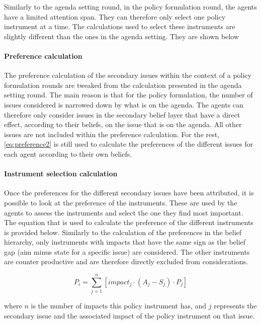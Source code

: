 Similarly to the agenda setting round, in the policy formulation round, the agents have a limited attention span. They can therefore only select one policy instrument at a time. The calculations used to select these instruments are slightly different than the ones in the agenda setting. They are shown below

\paragraph{Preference calculation}

The preference calculation of the secondary issues within the context of a policy formulation rounds are tweaked from the calculation presented in the agenda setting round. The main reason is that for the policy formulation, the number of issues considered is narrowed down by what is on the agenda. The agents can therefore only consider issues in the secondary belief layer that have a direct effect, according to their beliefs, on the issue that is on the agenda. All other issues are not included within the preference calculation. For the rest, \autoref{eq:preference2} is still used to calculate the preferences of the different issues for each agent according to their own beliefs.

\paragraph{Instrument selection calculation}

Once the preferences for the different secondary issues have been attributed, it is possible to look at the preference of the instruments. These are used by the agents to assess the instruments and select the one they find most important. The equation that is used to calculate the preference of the different instruments is provided below. Similarly to the calculation of the preferences in the belief hierarchy, only instruments with impacts that have the same sign as the belief gap (aim minus state for a specific issue) are considered. The other instruments are counter productive and are therefore directly excluded from considerations.

\begin{equation}
P_i = \sum_{j=1}^n \left[ impact_j \cdot \left( A_j - S_j \right) \cdot P_j \right]
\end{equation}

where $n$ is the number of impacts this policy instrument has, and $j$ represents the secondary issue and the associated impact of the policy instrument on that issue.

